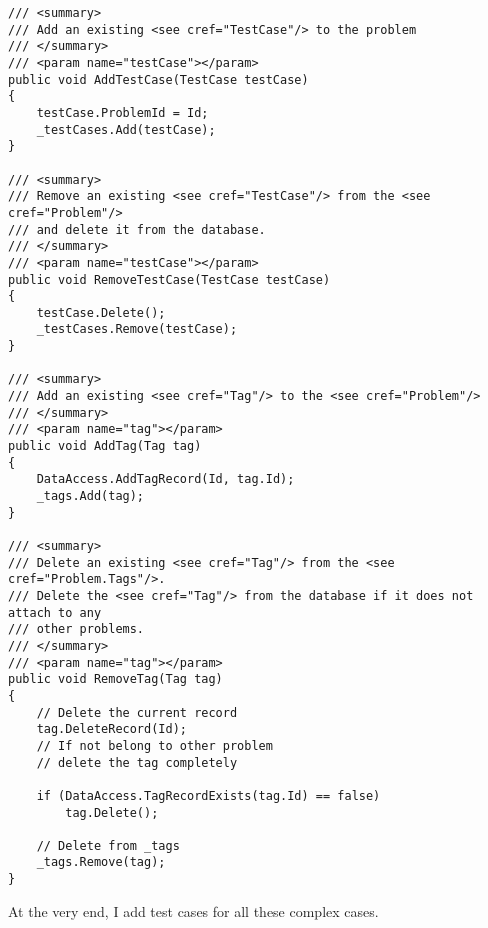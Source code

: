 \documentclass[report.tex]{subfiles}
\begin{document}
\begin{verbatim}
/// <summary>
/// Add an existing <see cref="TestCase"/> to the problem
/// </summary>
/// <param name="testCase"></param>
public void AddTestCase(TestCase testCase)
{
    testCase.ProblemId = Id;
    _testCases.Add(testCase);
}

/// <summary>
/// Remove an existing <see cref="TestCase"/> from the <see cref="Problem"/>
/// and delete it from the database.
/// </summary>
/// <param name="testCase"></param>
public void RemoveTestCase(TestCase testCase)
{
    testCase.Delete();
    _testCases.Remove(testCase);
}

/// <summary>
/// Add an existing <see cref="Tag"/> to the <see cref="Problem"/>
/// </summary>
/// <param name="tag"></param>
public void AddTag(Tag tag)
{
    DataAccess.AddTagRecord(Id, tag.Id);
    _tags.Add(tag);
}

/// <summary>
/// Delete an existing <see cref="Tag"/> from the <see cref="Problem.Tags"/>.
/// Delete the <see cref="Tag"/> from the database if it does not attach to any
/// other problems.
/// </summary>
/// <param name="tag"></param>
public void RemoveTag(Tag tag)
{
    // Delete the current record
    tag.DeleteRecord(Id);
    // If not belong to other problem
    // delete the tag completely

    if (DataAccess.TagRecordExists(tag.Id) == false)
        tag.Delete();
    
    // Delete from _tags
    _tags.Remove(tag);
}
\end{verbatim}

At the very end, I add test cases for all these complex cases.
\end{document}

